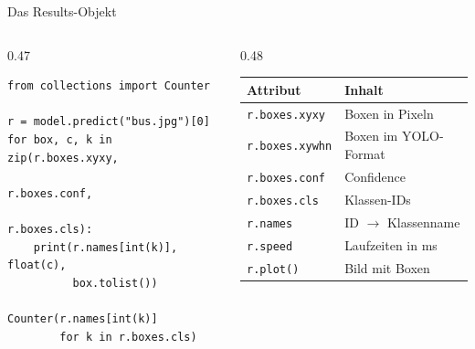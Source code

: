 \begin{frame}[fragile]{Das Results-Objekt}
\footnotesize
\begin{columns}
\begin{column}{0.47\textwidth}
{\footnotesize
\begin{verbatim}
from collections import Counter

r = model.predict("bus.jpg")[0]
for box, c, k in zip(r.boxes.xyxy,
                     r.boxes.conf,
                     r.boxes.cls):
    print(r.names[int(k)], float(c),
          box.tolist())

Counter(r.names[int(k)]
        for k in r.boxes.cls)
\end{verbatim}
}
\end{column}
\begin{column}{0.48\textwidth}
\centering
\begin{tabular}{ll}
\toprule
\textbf{Attribut} & \textbf{Inhalt} \\
\midrule
\texttt{r.boxes.xyxy} & Boxen in Pixeln \\
\texttt{r.boxes.xywhn} & Boxen im YOLO-Format \\
\texttt{r.boxes.conf} & Confidence \\
\texttt{r.boxes.cls} & Klassen-IDs \\
\texttt{r.names} & ID $\rightarrow$ Klassenname \\
\texttt{r.speed} & Laufzeiten in ms \\
\texttt{r.plot()} & Bild mit Boxen \\
\bottomrule
\end{tabular}
\end{column}
\end{columns}
\end{frame}

